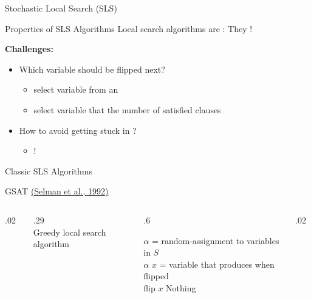 \documentclass[t]{sdqbeamer}
\begin{document}
\begin{frame}{Stochastic Local Search (SLS)}
	\begin{block}{Properties of SLS Algorithms}
		Local search algorithms are : They !\\[1em]
	\end{block}
	
	\vspace*{3mm}
	\textbf{Challenges:}
	\vspace*{3mm}
	\begin{itemize}\setlength{\itemsep}{0.8em}
		\item Which variable should be flipped next?
		\begin{itemize}
			\item<2-> select variable from an 
			\item<2-> select variable that  the number of satisfied clauses
		\end{itemize}
		\item<2-> How to avoid getting stuck in ?
		\begin{itemize}
			\item<3-> !
		\end{itemize}
	\end{itemize}
\end{frame}

\begin{frame}{Classic SLS Algorithms}
	\begin{block}{GSAT \href{http://dl.acm.org/citation.cfm?id=1867135.1867203}{(Selman et al., 1992)}}
		\setlength\columnsep{1ex}
		\begin{columns}[T]
			\begin{column}{.02\linewidth}
			\ 
			\end{column}%
			\begin{column}{.29\linewidth}
				~\\ Greedy local search algorithm
			\end{column}%
			\begin{column}{.6\linewidth}
				\begin{algorithm}[H]
					\DontPrintSemicolon
					\caption{GSAT}
					\BlankLine
					 {
						$\alpha$ = random-assignment to variables in $S$ \\
						 {
							 {
								\Return $\alpha$
							}
							$x$ = variable that produces  when flipped \\
							flip $x$
						}
					}
					\Return Nothing 
				\end{algorithm}
			\end{column}%
			\begin{column}{.02\linewidth}
				\ 
			\end{column}%
		\end{columns}
	\end{block}
\end{frame}
\end{document}

